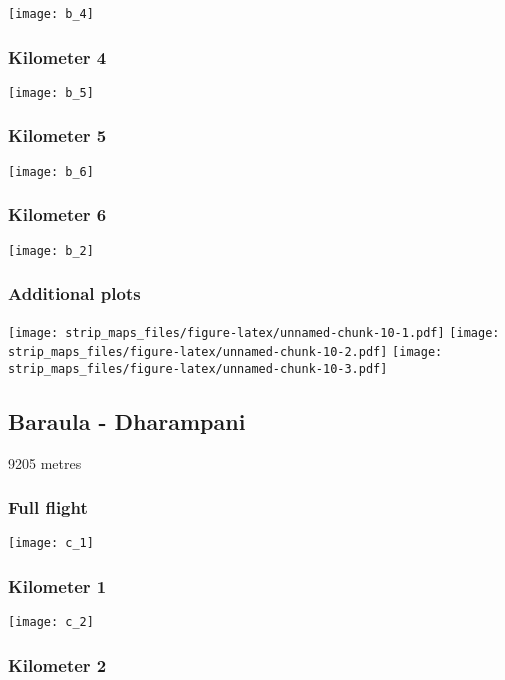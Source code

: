 \documentclass[]{article}
\begin{document}
\texttt{[image: b\_4]}

\subsubsection{Kilometer 4}\label{kilometer-4-1}

\texttt{[image: b\_5]}

\subsubsection{Kilometer 5}\label{kilometer-5-1}

\texttt{[image: b\_6]}

\subsubsection{Kilometer 6}\label{kilometer-6-1}

\texttt{[image: b\_2]}

\subsubsection{Additional plots}\label{additional-plots-1}

\texttt{[image: strip\_maps\_files/figure-latex/unnamed-chunk-10-1.pdf]}
\texttt{[image: strip\_maps\_files/figure-latex/unnamed-chunk-10-2.pdf]}
\texttt{[image: strip\_maps\_files/figure-latex/unnamed-chunk-10-3.pdf]}

\newpage

\subsection{Baraula - Dharampani}\label{baraula---dharampani}

9205 metres

\subsubsection{Full flight}\label{full-flight-2}

\texttt{[image: c\_1]}

\subsubsection{Kilometer 1}\label{kilometer-1-2}

\texttt{[image: c\_2]}

\subsubsection{Kilometer 2}\label{kilometer-2-2}
\end{document}
